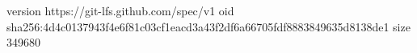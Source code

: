 version https://git-lfs.github.com/spec/v1
oid sha256:4d4c0137943f4e6f81c03cf1eacd3a43f2df6a66705fdf8883849635d8138de1
size 349680
